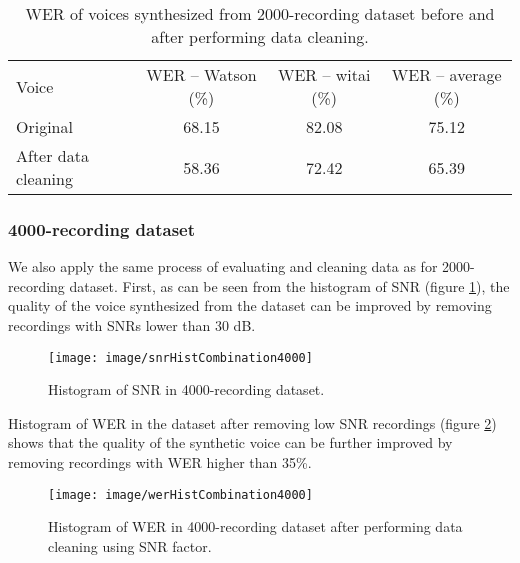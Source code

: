 \documentclass[12pt]{article}
\begin{document}
\begin{table}[]
\begin{center}
\caption{WER of voices synthesized from 2000-recording dataset before and after performing data cleaning.}
\label{tab_werCombination2000}
\vspace{3mm}
\begin{tabular}{lccc}
\hline
Voice & WER – Watson (\%) & WER – witai (\%) & WER – average (\%)\\
\cmidrule(l{0pt}r{2pt}){1-1}\cmidrule(l{0pt}r{2pt}){2-2}\cmidrule(l{0pt}r{2pt}){3-3}\cmidrule(l{0pt}r{2pt}){4-4}
Original            & 68.15 & 82.08 & 75.12 \\
After data cleaning & 58.36 & 72.42 & 65.39 \\
\hline
\end{tabular}
\end{center}
\end{table}

\subsubsection{4000-recording dataset}
We also apply the same process of evaluating and cleaning data as for 2000-recording dataset. First, as can be seen from the histogram of SNR (figure \ref{fig_snrHistCombination4000}), the quality of the voice synthesized from the dataset can be improved by removing recordings with SNRs lower than 30 dB.

\begin{figure}[t]
\begin{center}
\texttt{[image: image/snrHistCombination4000]}
\end{center}
\vspace{-0.3cm}
\caption[SNR hist combination 4000.]{Histogram of SNR in 4000-recording dataset.}
\label{fig_snrHistCombination4000}
\end{figure}

Histogram of WER in the dataset after removing low SNR recordings (figure \ref{fig_werHistCombination4000}) shows that the quality of the synthetic voice can be further improved by removing recordings with WER higher than 35\%.

\begin{figure}[t]
\begin{center}
\texttt{[image: image/werHistCombination4000]}
\end{center}
\vspace{-0.3cm}
\caption[WER hist combination 4000.]{Histogram of WER in 4000-recording dataset after performing data cleaning using SNR factor.}
\label{fig_werHistCombination4000}
\end{figure}
\end{document}
